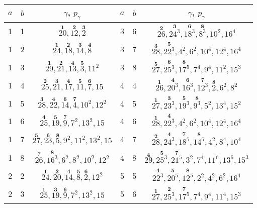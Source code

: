 \documentclass[12pt]{article}
\theoremstyle{definition}
\begin{document}
\begin{table}[]
    \centering
    \begin{tabular}{|c|c|c|c|c|c|}
    \hline
        $a$ & $b$ & $\gamma$, $p_\gamma$ & $a$ & $b$ & $\gamma$, $p_\gamma$ \\\hline
        1 & 1 & $\overset{\bm{1}}{20},\overset{\bm{2}}{12},\overset{\bm{3}}{2}$ & 3 & 6 & $\overset{\bm{2}}{26},\overset{\bm{3}}{24^3},\overset{\bm{6}}{18^3},\overset{\bm{8}}{8^3},10^2,16^4$ \\\hline
        1 & 2 & $\overset{\bm{1}}{24},\overset{\bm{2}}{18},\overset{\bm{3}}{14},\overset{\bm{4}}{8}$ & 3 & 7 & $\overset{\bm{3}}{28},\overset{\bm{5}}{22^3},4^2,6^2,10^4,12^4,16^4$ \\\hline
        1 & 3 & $\overset{\bm{1}}{29},\overset{\bm{2}}{21},\overset{\bm{4}}{13},\overset{\bm{5}}{3},11^2$ & 3 & 8 & $\overset{\bm{5}}{27},\overset{\bm{6}}{25^3},\overset{\bm{8}}{17^5},7^4,9^4,11^2,15^3$ \\\hline
        1 & 4 & $\overset{\bm{2}}{25},\overset{\bm{3}}{21},\overset{\bm{4}}{17},\overset{\bm{5}}{11},\overset{\bm{6}}{7},15$ & 4 & 4 & $\overset{\bm{1}}{26},\overset{\bm{4}}{20^3},\overset{\bm{6}}{16^3},\overset{\bm{7}}{12^3},\overset{\bm{8}}{2},6^2,8^2$ \\\hline
        1 & 5 & $\overset{\bm{3}}{28},\overset{\bm{4}}{22},\overset{\bm{6}}{14},\overset{\bm{7}}{4},10^2,12^2$ & 4 & 5 & $\overset{\bm{1}}{27},\overset{\bm{3}}{23^3},\overset{\bm{5}}{19^3},\overset{\bm{8}}{9^3},5^2,13^4,15^2$ \\\hline
        1 & 6 & $\overset{\bm{4}}{25},\overset{\bm{5}}{19},\overset{\bm{7}}{9},7^2,13^2,15$ & 4 & 6 & $\overset{\bm{1}}{28},\overset{\bm{4}}{22^3},4^2,6^2,10^4,12^4,16^4$ \\\hline
        1 & 7 & $\overset{\bm{5}}{27},\overset{\bm{6}}{23},\overset{\bm{8}}{5},9^2,11^2,13^2,15$ & 4 & 7 & $\overset{\bm{2}}{28},\overset{\bm{4}}{24^3},\overset{\bm{7}}{18^5},\overset{\bm{8}}{14^5},4^2,8^4,10^4$ \\\hline
        1 & 8 & $\overset{\bm{7}}{26},\overset{\bm{8}}{16^3},6^2,8^2,10^2,12^2$ & 4 & 8 & $\overset{\bm{4}}{29},\overset{\bm{5}}{25^3},\overset{\bm{7}}{21^5},3^2,7^4,11^6,13^6,15^3$ \\\hline
        2 & 2 & $\overset{\bm{1}}{24},\overset{\bm{2}}{20},\overset{\bm{4}}{14},\overset{\bm{5}}{8},\overset{\bm{6}}{2},12^2$ & 5 & 5 & $\overset{\bm{4}}{22^3},\overset{\bm{5}}{20^5},\overset{\bm{8}}{12^5},2^2,4^2,6^2,16^4$ \\\hline
        2 & 3 & $\overset{\bm{1}}{25},\overset{\bm{3}}{19},\overset{\bm{6}}{9},7^2,13^2,15$ & 5 & 6 & $\overset{\bm{1}}{27},\overset{\bm{2}}{25^3},\overset{\bm{7}}{17^5},7^4,9^4,11^4,15^3$ \\\hline

\end{tabular}
\end{table}
\end{document}
